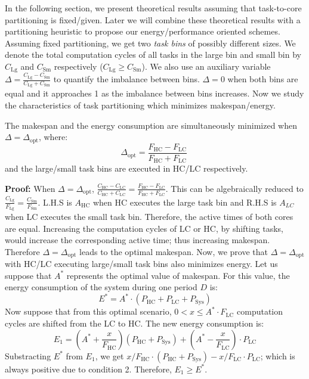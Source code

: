 In the following section, we present theoretical results assuming that task-to-core partitioning is fixed/given. Later we will combine these theoretical results with a partitioning heuristic to propose our energy/performance oriented schemes.
Assuming fixed partitioning, we get two \textit{task bins} of possibly different sizes. We denote the total computation cycles of all tasks in the large bin  and small bin by $C_\mathrm{Lg}$ and $C_\mathrm{Sm}$ respectively ($C_\mathrm{Lg}\geq C_\mathrm{Sm}$). We also use an auxiliary variable $\Delta=\frac{C_{\mathrm{Lg}}-C_{\mathrm{Sm}}}{C_{\mathrm{Lg}}+C_{\mathrm{Sm}}}$ to quantify the imbalance between bins. $\Delta=0$ when both bins are equal and it approaches 1 as the imbalance between bins increases. Now we study the characteristics of task partitioning which minimizes makespan/energy. 

\begin{theorem}\label{thm:delta_opt}
The makespan and the energy consumption are simultaneously minimized when $\Delta=\Delta_\mathrm{opt}$, where:
\begin{equation}\label{equ:deltaopt}
\Delta_\mathrm{opt}=\frac{F_\mathrm{HC}-F_\mathrm{LC}}{F_\mathrm{HC}+F_\mathrm{LC}}\;
\end{equation}
 and the large/small task bins are executed in HC/LC respectively.
\end{theorem}
\noindent\textbf{Proof:} When $\Delta=\Delta_\mathrm{opt}$, $\frac{C_\mathrm{HC}-C_\mathrm{LC}}{C_\mathrm{HC}+C_\mathrm{LC}} =\frac{F_\mathrm{HC}-F_\mathrm{LC}}{F_\mathrm{HC}+F_\mathrm{LC}}$. This can be algebraically reduced to $\frac{C_\mathrm{Lg}}{F_\mathrm{Lg}} = \frac{C_\mathrm{Sm}}{F_\mathrm{Sm}}$. L.H.S is $A_\mathrm{HC}$ when HC executes the large task bin and R.H.S is $A_{LC}$ when LC executes the small task bin. Therefore, the active times of both cores are equal. Increasing the computation cycles of LC or HC, by shifting tasks, would increase the corresponding active time; thus increasing makespan. Therefore $\Delta=\Delta_\mathrm{opt}$ leads to the optimal makespan.
Now, we prove that $\Delta=\Delta_\mathrm{opt}$ with HC/LC executing large/small task bins also minimizes energy. Let us suppose that $A^*$ represents the optimal value of makespan. For this value, the energy consumption of the system during one period $D$ is: 
\begin{equation*}
E^*=A^*\cdot (P_\mathrm{HC} + P_\mathrm{LC}+ P_\mathrm{Sys})
\end{equation*}
Now suppose that from this optimal scenario, $0< x\leq A^*\cdot F_\mathrm{LC}$ computation cycles are shifted from the LC to HC. The new energy consumption is:
\begin{equation*}
E_1=(A^*+ \frac{x}{F_\mathrm{HC}})(P_\mathrm{HC} + P_\mathrm{Sys})+ (A^*- \frac{x}{F_\mathrm{LC}})  \cdot P_\mathrm{LC}
\end{equation*} 
Substracting $E^*$ from $E_1$, we get $x/F_\mathrm{HC}\cdot(P_\mathrm{HC}+P_\mathrm{Sys}) - x/F_\mathrm{LC}\cdot P_\mathrm{LC}$; which is always positive due to condition 2. Therefore, $E_1\geq E^*.$ 

